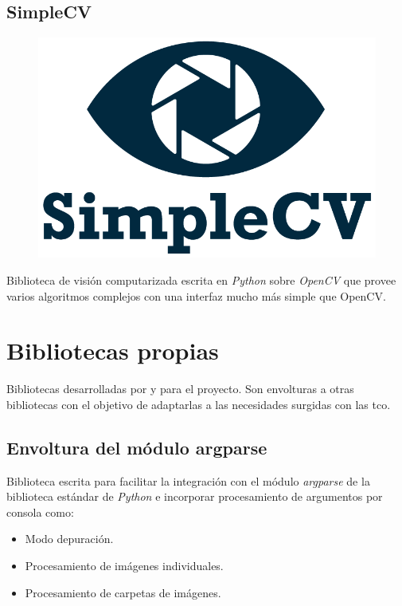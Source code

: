 \subsection{SimpleCV}
\begin{figure}[H]
  \hspace*{1.7cm}
  \includegraphics[scale=0.3]{imagenes/logos/simplecv_logo.png}
\end{figure}
Biblioteca de visión computarizada escrita en \emph{Python} sobre
\emph{OpenCV} que provee varios algoritmos complejos con una interfaz
mucho más simple que OpenCV\@.

\section{Bibliotecas propias}

Bibliotecas desarrolladas por y para el proyecto. Son envolturas a
otras bibliotecas con el objetivo de adaptarlas a las necesidades
surgidas con las \gls{tco}.

\subsection{Envoltura del módulo argparse}
Biblioteca escrita para facilitar la integración con el módulo
\emph{argparse} de la biblioteca estándar de \emph{Python} e
incorporar procesamiento de argumentos por consola como:
\begin{itemize}
\item Modo depuración.
\item Procesamiento de imágenes individuales.
\item Procesamiento de carpetas de imágenes.
\end{itemize}

